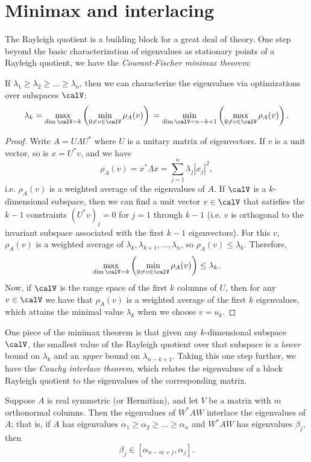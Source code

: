 \section{Minimax and interlacing}

The Rayleigh quotient is a building block for a great deal of theory.
One step beyond the basic characterization of eigenvalues as stationary
points of a Rayleigh quotient, we have
the {\em Courant-Fischer minimax theorem}:
\begin{theorem}
  If $\lambda_1 \geq \lambda_2 \geq \ldots \geq \lambda_n$, then
  we can characterize the eigenvalues via optimizations over
  subspaces $\calV$:
  \[
    \lambda_k
      = \max_{\dim \calV = k} \left( \min_{0 \neq v \in \calV} \rho_A(v) \right) \\
      = \min_{\dim \calV = n-k+1} \left( \max_{0 \neq v \in \calV} \rho_A(v) \right).
  \]
\end{theorem}

\begin{proof}
  Write $A = U \Lambda U^*$ where $U$ is a unitary matrix of eigenvectors.
  If $v$ is a unit vector, so is $x = U^* v$, and we have
  \[
    \rho_A(v) = x^* \Lambda x = \sum_{j=1}^n \lambda_j |x_j|^2,
  \]
  i.e. $\rho_A(v)$ is a weighted average of the eigenvalues
  of $A$.  If $\calV$ is a $k$-dimensional subspace, then we can find
  a unit vector $v \in \calV$ that satisfies the $k-1$ constraints
  $(U^* v)_j = 0$ for $j = 1$ through $k-1$ (i.e. $v$ is orthogonal to
  the invariant subspace associated with the first $k-1$
  eigenvectors).  For this $v$, $\rho_A(v)$ is a weighted average of
  $\lambda_k, \lambda_{k+1}, \ldots, \lambda_n$, so $\rho_A(v) \leq
  \lambda_k$.  Therefore,
  \[
      \max_{\dim \calV = k} \left( \min_{0 \neq v \in \calV} \rho_A(v) \right)
      \leq \lambda_k.
  \]
  Now, if $\calV$ is the range space of the first $k$ columns of $U$,
  then for any $v \in \calV$ we have that $\rho_A(v)$ is a weighted
  average of the first $k$ eigenvalues, which attains the minimal value
  $\lambda_k$ when we choose $v = u_k$.
\end{proof}

One piece of the minimax theorem is that given any $k$-dimensional subspace
$\calV$, the smallest value of the Rayleigh quotient over that
subspace is a {\em lower} bound on $\lambda_k$ and an {\em upper} bound
on $\lambda_{n-k+1}$.  Taking this one step further, we have the {\em Cauchy
interlace theorem}, which relates the eigenvalues of a block Rayleigh quotient
to the eigenvalues of the corresponding matrix.
\begin{theorem}
  Suppose $A$ is real symmetric (or Hermitian), and let $V$ be a
  matrix with $m$ orthonormal columns.  Then the eigenvalues of
  $W^* A W$ interlace the eigenvalues of $A$; that is, if $A$
  has eigenvalues $\alpha_1 \geq \alpha_2 \geq \ldots \geq \alpha_n$
  and $W^* A W$ has eigenvalues $\beta_j$, then
  \[
    \beta_j \in [\alpha_{n-m+j}, \alpha_j].
  \]
\end{theorem}

